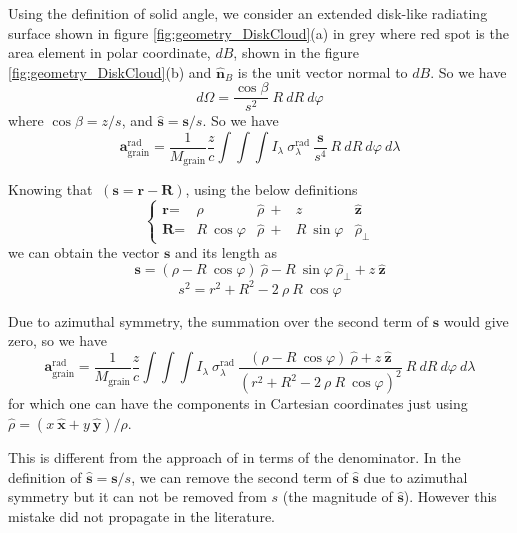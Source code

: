 \documentclass[twocolumn]{aastex62}
\begin{document}
Using the definition of solid angle, we consider an extended disk-like radiating surface shown in figure \ref{fig:geometry_DiskCloud}(a) in grey where red spot is the area element in polar coordinate, $dB$, shown in the figure \ref{fig:geometry_DiskCloud}(b) and $\hat{\textbf{n}}_{B}$ is the unit vector normal to $dB$. So we have
\begin{equation}
d\Omega = \frac{\cos\beta}{s^2}\  R\ dR\ d\varphi
\end{equation}
where $\cos\beta= z/s$, and $\hat{\textbf{s}}=\textbf{s}/s$.
So we have
\begin{equation}
\textbf{a}_{\mathrm{grain}}^{\mathrm{rad}} =
\frac{1}{M_{\mathrm{grain}}}  \frac{z}{c}
\int\int\int I_{\lambda}\ \sigma_{\lambda}^{\mathrm{rad}} \ \frac{{\textbf{s}}}{s^4}\  R\ dR\ d\varphi\ d\lambda
\end{equation}

Knowing that $\ (\mathbf{s=r-R})$, using the below definitions
\begin{equation}
\left\{
\begin{array}{lclcl}
\textbf{r}  = & \rho &\hat{\rho}\ + & z &\hat{\textbf{z}}   \\
\textbf{R}  = &  R\ \cos\varphi & \hat{\rho}\ + & R\ \sin\varphi &\hat{\rho}_{\bot}
\end{array}
\right.
\end{equation}
we can obtain the vector $\mathbf{s}$ and its length as
\begin{equation}
\textbf{s} =
(\rho- R\ \cos\varphi)\ \hat{{\rho}} -
R\ \sin\varphi\  \hat{{\rho}}_{\bot} +
z\ \hat{\textbf{z}}
\end{equation}
\begin{equation}
s^2= r^2 + R^2 - 2\ \rho\ R\ \cos\varphi
\end{equation}

Due to azimuthal symmetry, the summation over the second term of $\textbf{s}$ would give zero, so we have
\begin{equation}
\textbf{a}_{\mathrm{grain}}^{\mathrm{rad}} =
\frac{1}{M_{\mathrm{grain}}}  \frac{z}{c}
\int\int\int I_{\lambda}\ \sigma_{\lambda}^{\mathrm{rad}}\ 
\frac{(\rho- R\ \cos\varphi)\ \hat{{\rho}} + z\ \hat{\textbf{z}}}
{( r^2 + R^2 - 2\ \rho\ R\ \cos\varphi ) ^{2}}\  R\ dR\ d\varphi\ d\lambda
\end{equation}
for which one can have the components in Cartesian coordinates just using
$\hat{\rho}  = ( x\ \hat{\mathbf{x}} + y\ \hat{\mathbf{y}} ) / \rho$.

This is different from the approach of \citet{icke1980} in terms of the denominator. In the definition of $\hat{\textbf{s}}=\textbf{s}/s$, we can remove the second term of $\hat{\textbf{s}}$ due to azimuthal symmetry but it can not be removed from $s$ (the magnitude of $\hat{\textbf{s}}$).
However this mistake did not propagate in the literature.
\end{document}
